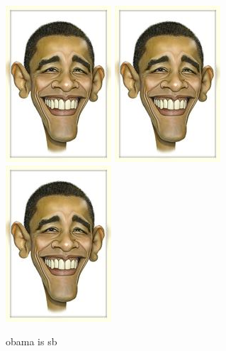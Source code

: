 \documentclass[12pt]{article}
\begin{document}
    \begin{figure}[htbp]
        \centering
        \includegraphics{obama.jpg}
        \includegraphics{obama.jpg}
        \includegraphics{obama.jpg}
        \caption{obama is sb}
    \end{figure}
    
\end{document}
